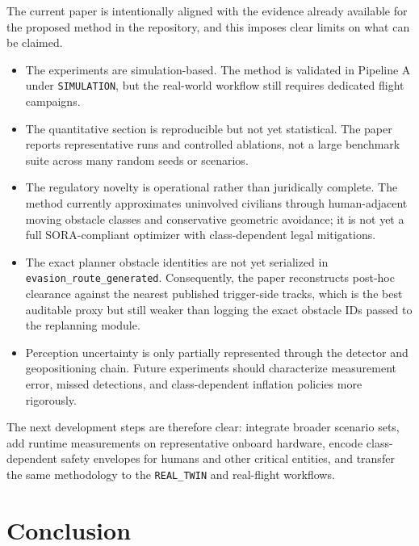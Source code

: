 \documentclass[journal,twoside,web]{ieeecolor}
\begin{document}
The current paper is intentionally aligned with the evidence already available for the proposed method in the repository, and this imposes clear limits on what can be claimed.
\begin{itemize}[leftmargin=1.3em]
    \item The experiments are simulation-based. The method is validated in Pipeline A under \texttt{SIMULATION}, but the real-world workflow still requires dedicated flight campaigns.
    \item The quantitative section is reproducible but not yet statistical. The paper reports representative runs and controlled ablations, not a large benchmark suite across many random seeds or scenarios.
    \item The regulatory novelty is operational rather than juridically complete. The method currently approximates uninvolved civilians through human-adjacent moving obstacle classes and conservative geometric avoidance; it is not yet a full SORA-compliant optimizer with class-dependent legal mitigations.
    \item The exact planner obstacle identities are not yet serialized in \texttt{evasion\_route\_generated}. Consequently, the paper reconstructs post-hoc clearance against the nearest published trigger-side tracks, which is the best auditable proxy but still weaker than logging the exact obstacle IDs passed to the replanning module.
    \item Perception uncertainty is only partially represented through the detector and geopositioning chain. Future experiments should characterize measurement error, missed detections, and class-dependent inflation policies more rigorously.
\end{itemize}

The next development steps are therefore clear: integrate broader scenario sets, add runtime measurements on representative onboard hardware, encode class-dependent safety envelopes for humans and other critical entities, and transfer the same methodology to the \texttt{REAL\_TWIN} and real-flight workflows.


\section{Conclusion}
\end{document}

